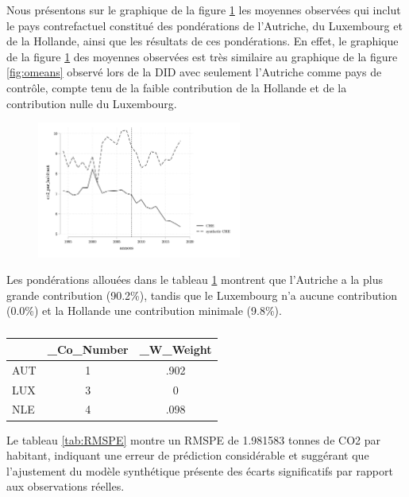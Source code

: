 {Nous présentons sur le graphique de la figure \ref{fig:scm_omeans} les moyennes observées qui inclut le pays contrefactuel constitué des pondérations de l'Autriche, du Luxembourg et de la Hollande, ainsi que les résultats de ces pondérations. En effet, le graphique de la figure \ref{fig:scm_omeans} des moyennes observées est très similaire au graphique de la figure \ref{fig:omeans} observé lors de la DID avec seulement l'Autriche comme pays de contrôle, compte tenu de la faible contribution de la Hollande et de la contribution nulle du Luxembourg.

\vspace*{-0.6cm}
\begin{figure}[h]
\centering
\includegraphics[width=0.6\textwidth]{Article/images/scm_omeans.png}
\caption{}
\label{fig:scm_omeans}
    \end{figure}


Les pondérations allouées dans le tableau \ref{tab:unit_weights} montrent que l'Autriche a la plus grande contribution (90.2\%), tandis que le Luxembourg n'a aucune contribution (0.0\%) et la Hollande une contribution minimale (9.8\%).

\begin{table}[ht]
\centering
\footnotesize{
\begin{tabular}{|l|*{2}{c}|}
\hline
            &  \_Co\_Number &   \_W\_Weight\\
\hline
AUT         &           1   &        .902\\
LUX         &           3   &           0\\
NLE         &           4   &        .098\\
\hline
\end{tabular}
}
\caption{}
\label{tab:unit_weights}
\end{table}

Le tableau \ref{tab:RMSPE} montre un RMSPE de 1.981583 tonnes de CO2 par habitant, indiquant une erreur de prédiction considérable et suggérant que l'ajustement du modèle synthétique présente des écarts significatifs par rapport aux observations réelles.

}
